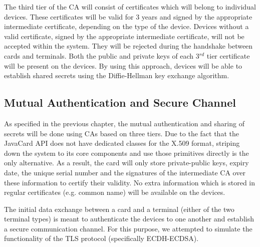 \documentclass[a4paper,10pt]{llncs}
\begin{document}
The third tier of the CA will consist of certificates which will belong to individual devices. These certificates will be valid for 3 years and signed by the appropriate intermediate certificate, depending on the type of the device. Devices without a valid certificate, signed by the appropriate intermediate certificate, will not be accepted within the system. They will be rejected during the handshake between cards and terminals. Both the public and private keys of each 3$^{rd}$ tier certificate will be present on the devices. By using this approach, devices will be able to establish shared secrets using the Diffie-Hellman key exchange algorithm.

\subsection{Mutual Authentication and Secure Channel}
\label{section:mutualauth}
As specified in the previous chapter, the mutual authentication and sharing of secrets will be done using CAs based on three tiers. Due to the fact that the JavaCard API does not have dedicated classes for the X.509 format, striping down the system to its core components and use those primitives directly is the only alternative. As a result, the card will only store private-public keys, expiry date, the unique serial number and the signatures of the intermediate CA over these information to certify their validity. No extra information which is stored in regular certificates (e.g. common name) will be available on the devices.

The initial data exchange between a card and a terminal (either of the two terminal types) is meant to authenticate the devices to one another and establish a secure communication channel. For this purpose, we attempted to simulate the functionality of the TLS protocol (specifically ECDH-ECDSA). 
\end{document}
